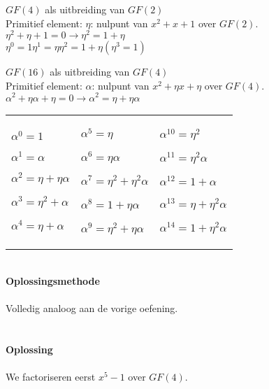 \documentclass[11pt,a4paper,titlepage]{article}
\begin{document}
$GF(4)$ als uitbreiding van $GF(2)$\\
Primitief element: $\eta$: nulpunt van $x^2 + x + 1$ over $GF(2)$.\\
$\eta^2 + \eta + 1 = 0  \rightarrow  \eta^2 = 1 + \eta$\\
$\eta^0 = 1$\hspace{0.5cm}$\eta^1 = \eta$\hspace{0.5cm}$\eta^2 = 1 + \eta$\hspace{0.5cm}$(\eta^3 = 1)$

$GF(16)$ als uitbreiding van $GF(4)$\\
Primitief element: $\alpha$: nulpunt van $x^2 + \eta x + \eta$ over $GF(4)$.\\
$\alpha^2 + \eta \alpha + \eta = 0   \rightarrow  \alpha^2 = \eta + \eta \alpha$\\
\begin{tabularx}{\textwidth}{XXX}
$\alpha^{0} = 1$

$\alpha^{1} = \alpha$

$\alpha^{2} = \eta + \eta \alpha$

$\alpha^{3} = \eta^2 + \alpha$

$\alpha^{4} = \eta + \alpha$

&

$\alpha^{5} = \eta$

$\alpha^{6} = \eta \alpha$

$\alpha^{7} = \eta^2 + \eta^2 \alpha$

$\alpha^{8} = 1 + \eta \alpha$

$\alpha^{9} = \eta^2 + \eta \alpha$

&

$\alpha^{10} = \eta^2$

$\alpha^{11} = \eta^2 \alpha$

$\alpha^{12} = 1 + \alpha$

$\alpha^{13} = \eta + \eta^2 \alpha$

$\alpha^{14} = 1 + \eta^2 \alpha$
\end{tabularx}
\noindent \\ \textbf{Oplossingsmethode} \\ \\
	Volledig analoog aan de vorige oefening.
\\ \\ \\ \textbf{Oplossing} \\ \\
	We factoriseren eerst $x^5-1$ over $GF(4)$.\\ \\
\end{document}
